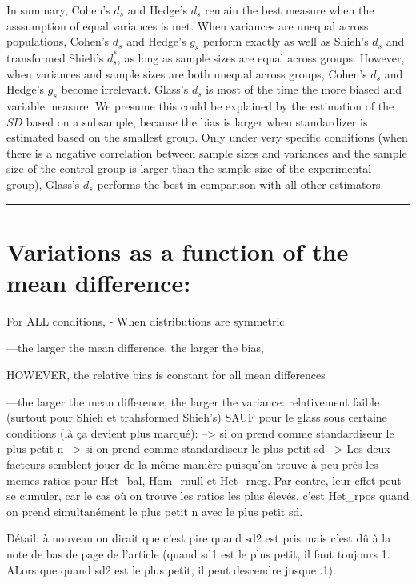 \documentclass[
  man,floatsintext]{apa6}
\begin{document}
In summary, Cohen's \(d_s\) and Hedge's \(d_s\) remain the best measure when the asssumption of equal variances is met. When variances are unequal across populations, Cohen's \(d_s\) and Hedge's \(g_s\) perform exactly as well as Shieh's \(d_s\) and transformed Shieh's \(d^*_s\), as long as sample sizes are equal across groups. However, when variances and sample sizes are both unequal across groups, Cohen's \(d_s\) and Hedge's \(g_s\) become irrelevant. Glass's \(d_s\) is most of the time the more biased and variable measure. We presume this could be explained by the estimation of the \(SD\) based on a subsample, because the bias is larger when standardizer is estimated based on the smallest group. Only under very specific conditions (when there is a negative correlation between sample sizes and variances and the sample size of the control group is larger than the sample size of the experimental group), Glass's \(d_s\) performs the best in comparison with all other estimators.

\begin{center}\rule{0.5\linewidth}{0.5pt}\end{center}

\hypertarget{variations-as-a-function-of-the-mean-difference}{%
\section{Variations as a function of the mean difference:}\label{variations-as-a-function-of-the-mean-difference}}

For ALL conditions,
- When distributions are symmetric

---the larger the mean difference, the larger the bias,

HOWEVER, the relative bias is constant for all mean differences

---the larger the mean difference, the larger the variance: relativement faible (surtout pour Shieh et trahsformed Shieh's) SAUF pour le glass sous certaine conditions (là ça devient plus marqué):
--\textgreater{} si on prend comme standardiseur le plus petit n
--\textgreater{} si on prend comme standardiseur le plus petit sd
--\textgreater{} Les deux facteurs semblent jouer de la même manière puisqu'on trouve à peu près les memes ratios pour Het\_bal, Hom\_rnull et Het\_rneg. Par contre, leur effet peut se cumuler, car le cas où on trouve les ratios les plus élevés, c'est Het\_rpos quand on prend simultanément le plus petit n avec le plus petit sd.

Détail: à nouveau on dirait que c'est pire quand sd2 est pris mais c'est dû à la note de bas de page de l'article (quand sd1 est le plus petit, il faut toujours 1. ALors que quand sd2 est le plus petit, il peut descendre jusque .1).
\end{document}
